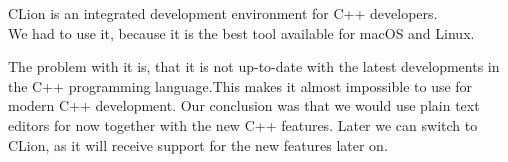 CLion is an integrated development environment for C++ developers. \cite{clion} \\
We had to use it, because it is the best tool available for macOS and Linux.

The problem with it is, that it is not up-to-date with the latest developments in the C++ programming language.This makes it almost impossible to use for modern C++ development. Our conclusion was that we would use plain text editors for now together with the new C++ features. Later we can switch to CLion, as it will receive support for the new features later on. \cite{clionstatus}
